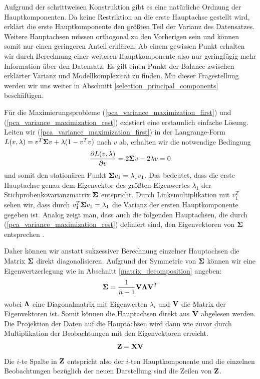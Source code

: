 Aufgrund der schrittweisen Konstruktion gibt es eine natürliche Ordnung der Hauptkomponenten. Da keine Restriktion an die erste Hauptachse gestellt wird, erklärt die erste Hauptkomponente den größten Teil der Varianz des Datensatzes. Weitere Hauptachsen müssen orthogonal zu den Vorherigen sein und können somit nur einen geringeren Anteil erklären. Ab einem gewissen Punkt erhalten wir durch Berechnung einer weiteren Hauptkomponente also nur geringfügig mehr Information über den Datensatz. Es gilt einen Punkt der Balance zwischen erklärter Varianz und Modellkomplexität zu finden. Mit dieser Fragestellung werden wir uns weiter in Abschnitt \ref{selection_principal_components} beschäftigen.

Für die Maximierungsprobleme (\ref{pca_variance_maximization_first}) und (\ref{pca_variance_maximization_rest}) existiert eine erstaunlich einfache Lösung. Leiten wir (\ref{pca_variance_maximization_first}) in der Langrange-Form $L(v, \lambda) = v^T\mathbf{\Sigma}v + \lambda (1-v^Tv)$ nach $v$ ab, erhalten wir die notwendige Bedingung 
$$\frac{\partial L(v,\lambda)}{\partial v} = 2\mathbf{\Sigma} v -2\lambda v=0$$
und somit den stationären Punkt $\mathbf{\Sigma}v_1 = \lambda_1 v_1$. Das bedeutet, dass die erste Hauptachse genau dem Eigenvektor des größten Eigenwertes $\lambda_1$ der Stichprobenkovarianzmatrix $\mathbf{\Sigma}$ entspricht. Durch Linksmultiplikation mit $v_1^T$ sehen wir, dass durch 
$v_1^T\mathbf{\Sigma}v_1 = \lambda_1$ die Varianz der ersten Hauptkomponente gegeben ist. Analog zeigt man, dass auch die folgenden Hauptachsen, die durch (\ref{pca_variance_maximization_rest}) definiert sind, den Eigenvektoren von $\mathbf{\Sigma}$ entsprechen \cite{bishop}.

Daher können wir anstatt sukzessiver Berechnung einzelner Hauptachsen die Matrix $\mathbf{\Sigma}$ direkt diagonalisieren. Aufgrund der Symmetrie von $\mathbf{\Sigma}$ können wir eine Eigenwertzerlegung wie in Abschnitt \ref{matrix_decomposition} angeben:
$$\mathbf{\Sigma} = \frac{1}{n-1}\mathbf{V} \mathbf{\Lambda} \mathbf{V}^T$$
wobei $\mathbf{\Lambda}$ eine Diagonalmatrix mit Eigenwerten $\lambda_i$ und $\mathbf{V}$ die Matrix der Eigenvektoren ist. Somit können die Hauptachsen direkt aus $\mathbf{V}$ abgelesen werden. Die Projektion der Daten auf die Hauptachsen wird dann wie zuvor durch Multiplikation der Beobachtungen mit den Eigenvektoren erreicht. 
$$\mathbf{Z} = \mathbf{X} \mathbf{V}$$
Die $i$-te Spalte in $\mathbf{Z}$ entspricht also der $i$-ten Hauptkomponente und die einzelnen Beobachtungen bezüglich der neuen Darstellung sind die Zeilen von $\mathbf{Z}$.

